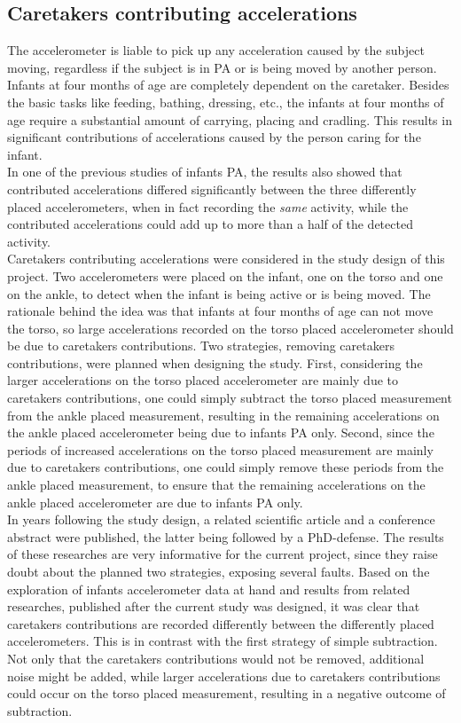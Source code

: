 \documentclass{article}
\begin{document}
{\subsection{Caretakers contributing accelerations}
The accelerometer is liable to pick up any acceleration caused by the subject moving, regardless if the subject is in PA or is being moved by another person. Infants at four months of age are completely dependent on the caretaker. Besides the basic tasks like feeding, bathing, dressing, etc., the infants at four months of age require a substantial amount of carrying, placing and cradling. This results in significant contributions of accelerations caused by the person caring for the infant\cite{ref1}\cite{ref5}\cite{ref6}.\\In one of the previous studies of infants PA\cite{ref5}, the results also showed that contributed accelerations differed significantly between the three differently placed accelerometers, when in fact recording the \textit{same} activity, while the contributed accelerations could add up to more than a half of the detected activity. \\Caretakers contributing accelerations were considered in the study design of this project. Two accelerometers were placed on the infant, one on the torso and one on the ankle, to detect when the infant is being active or is being moved. The rationale behind the idea was that infants at four months of age can not move the torso, so large accelerations recorded on the torso placed accelerometer should be due to caretakers contributions. Two strategies, removing caretakers contributions, were planned when designing the study. First, considering the larger accelerations on the torso placed accelerometer are mainly due to caretakers contributions, one could simply subtract the torso placed measurement from the ankle placed measurement, resulting in the remaining accelerations on the ankle placed accelerometer being due to infants PA only. Second, since the periods of increased accelerations on the torso placed measurement are mainly due to caretakers contributions, one could simply remove these periods from the ankle placed measurement, to ensure that the remaining accelerations on the ankle placed accelerometer are due to infants PA only.\\In years following the study design, a related scientific article\cite{ref1} and a conference abstract\cite{ref5} were published, the latter being followed by a PhD-defense\cite{ref6}. The results of these researches are very informative for the current project, since they raise doubt about the planned two strategies, exposing several faults. Based on the exploration of infants accelerometer data at hand and results from related researches, published after the current study was designed, it was clear that caretakers contributions are recorded differently between the differently placed accelerometers. This is in contrast with the first strategy of simple subtraction. Not only that the caretakers contributions would not be removed, additional noise might be added, while larger accelerations due to caretakers contributions could occur on the torso placed measurement, resulting in a negative outcome of subtraction. }
\end{document}
